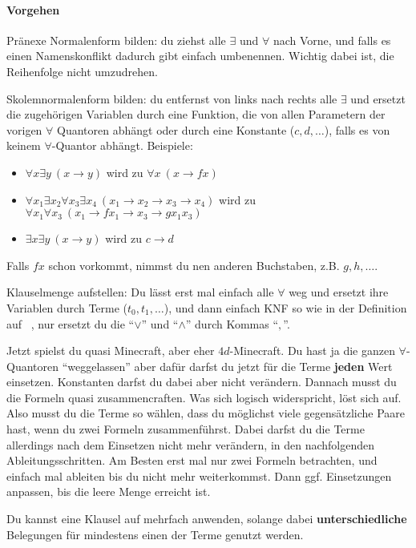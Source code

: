 \documentclass[
    ngerman,
    color=3b,
    summary,
    boxarc,
    main,
    fleqn,
    leqno,
]{rubos-tuda-template}
\begin{document}
    \paragraph{Vorgehen}
    \begin{steps}
        \item Pränexe Normalenform bilden: du ziehst alle $\exists$ und $\forall$ nach Vorne, und falls es einen Namenskonflikt dadurch gibt einfach umbenennen. Wichtig dabei ist, die Reihenfolge nicht umzudrehen.
        \item Skolemnormalenform bilden: du entfernst von links nach rechts alle $\exists$ und ersetzt die zugehörigen Variablen durch eine Funktion, die von allen Parametern der vorigen $\forall$ Quantoren abhängt oder durch eine Konstante ($c,d,\dots$), falls es von keinem $\forall$-Quantor abhängt.
        Beispiele:\begin{itemize}
            \item  $\forall x\exists y~\left(x\rightarrow y\right)$ wird zu $\forall x~\left(x\rightarrow fx\right)$
            \item  $\forall x_1\exists x_2\forall x_3\exists x_4~\left(x_1\rightarrow x_2\rightarrow x_3\rightarrow x_4\right)$ wird zu $\forall x_1\forall x_3~\left(x_1\rightarrow fx_1\rightarrow x_3\rightarrow gx_1x_3\right)$
            \item  $\exists x\exists y~\left(x\rightarrow y\right)$ wird zu $c\rightarrow d$
        \end{itemize} Falls $fx$ schon vorkommt, nimmst du nen anderen Buchstaben, z.B. $g,h,\dots$.
        \item Klauselmenge aufstellen: Du lässt erst mal einfach alle $\forall$ weg und ersetzt ihre Variablen durch Terme ($t_0,t_1,\dots$), und dann einfach KNF so wie in der Definition auf \pagename~\pageref{knf}, nur ersetzt du die \enquote{$\lor$} und \enquote{$\land$} durch Kommas \enquote{$,$}.
        \item Jetzt spielst du quasi Minecraft, aber eher $4d$-Minecraft. Du hast ja die ganzen $\forall$-Quantoren \enquote{weggelassen} aber dafür darfst du jetzt für die Terme \textbf{jeden} Wert einsetzen. Konstanten darfst du dabei aber nicht verändern. Dannach musst du die Formeln quasi zusammencraften. Was sich logisch widerspricht, löst sich auf. Also musst du die Terme so wählen, dass du möglichst viele gegensätzliche Paare hast, wenn du zwei Formeln zusammenführst. Dabei darfst du die Terme allerdings nach dem Einsetzen nicht mehr verändern, in den nachfolgenden Ableitungsschritten. Am Besten erst mal nur zwei Formeln betrachten, und einfach mal ableiten bis du nicht mehr weiterkommst. Dann ggf. Einsetzungen anpassen, bis die leere Menge erreicht ist.
    \end{steps}
    \begin{hinweis}
        Du kannst eine Klausel auf mehrfach anwenden, solange dabei \textbf{unterschiedliche} Belegungen für mindestens einen der Terme genutzt werden.
    \end{hinweis}
\end{document}
